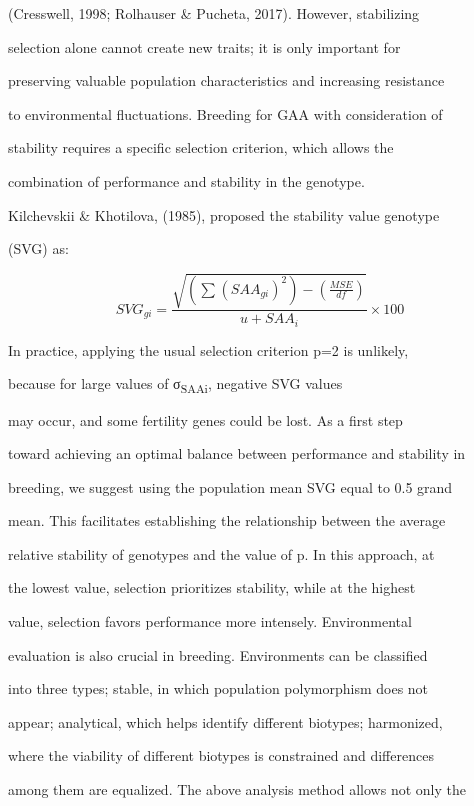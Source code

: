 \documentclass[10pt,twoside]{article}
\numberwithin{equation}{section}
\begin{document}
(Cresswell, 1998; Rolhauser \& Pucheta, 2017). However, stabilizing

selection alone cannot create new traits; it is only important for

preserving valuable population characteristics and increasing resistance

to environmental fluctuations. Breeding for GAA with consideration of

stability requires a specific selection criterion, which allows the

combination of performance and stability in the genotype.



Kilchevskii \& Khotilova, (1985), proposed the stability value genotype

(SVG) as:



\[{SVG}_{gi} = \frac{\sqrt{\left( \sum_{}^{}{({SAA}_{gi})}^{2} \right) - (\frac{MSE}{df})}}{u + {SAA}_{i}} \times 100\]



In practice, applying the usual selection criterion p=2 is unlikely,

because for large values of σ\textsubscript{SAAi}, negative SVG values

may occur, and some fertility genes could be lost. As a first step

toward achieving an optimal balance between performance and stability in

breeding, we suggest using the population mean SVG equal to 0.5 grand

mean. This facilitates establishing the relationship between the average

relative stability of genotypes and the value of p. In this approach, at

the lowest value, selection prioritizes stability, while at the highest

value, selection favors performance more intensely. Environmental

evaluation is also crucial in breeding. Environments can be classified

into three types; stable, in which population polymorphism does not

appear; analytical, which helps identify different biotypes; harmonized,

where the viability of different biotypes is constrained and differences

among them are equalized. The above analysis method allows not only the
\end{document}
